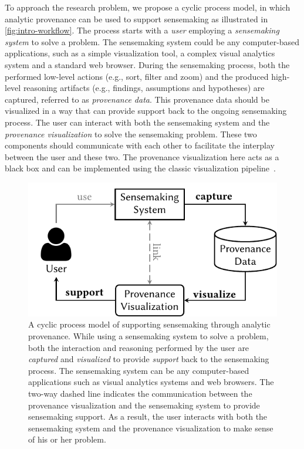 To approach the research problem, we propose a cyclic process model, in which analytic provenance can be used to support sensemaking as illustrated in \autoref{fig:intro-workflow}. The process starts with a \emph{user} employing a \emph{sensemaking system} to solve a problem. The sensemaking system could be any computer-based applications, such as a simple visualization tool, a complex visual analytics system and a standard web browser. During the sensemaking process, both the performed low-level actions (e.g., sort, filter and zoom) and the produced high-level reasoning artifacts (e.g., findings, assumptions and hypotheses) are captured, referred to as \emph{provenance data}. This provenance data should be visualized in a way that can provide support back to the ongoing sensemaking process. The user can interact with both the sensemaking system and the \emph{provenance visualization} to solve the sensemaking problem. These two components should communicate with each other to facilitate the interplay between the user and these two. The provenance visualization here acts as a black box and can be implemented using the classic visualization pipeline~\cite{Card1999}.

\begin{figure}
	\centering
	\includegraphics[width=.8\linewidth]{workflow}
	\caption[A cyclic sensemaking-support model through analytic provenance]{A cyclic process model of supporting sensemaking through analytic provenance. While using a sensemaking system to solve a problem, both the interaction and reasoning performed by the user are \emph{captured} and \emph{visualized} to provide \emph{support} back to the sensemaking process. The sensemaking system can be any computer-based applications such as visual analytics systems and web browsers. The two-way dashed line indicates the communication between the provenance visualization and the sensemaking system to provide sensemaking support. As a result, the user interacts with both the sensemaking system and the provenance visualization to make sense of his or her problem.}
	\label{fig:intro-workflow}
\end{figure}

